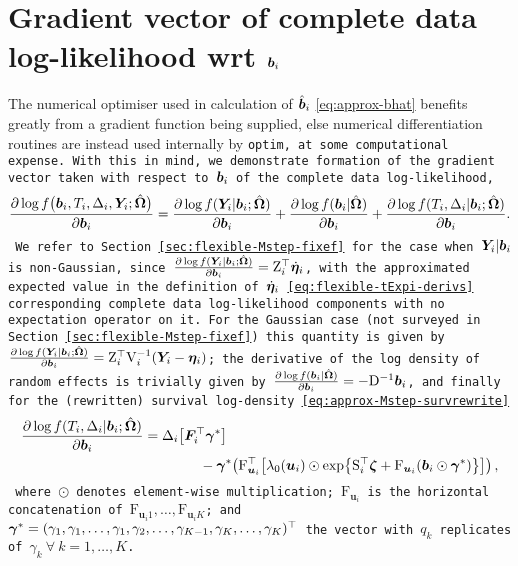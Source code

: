 \section{Gradient vector of complete data log-likelihood wrt \texorpdfstring{$\bm{b}_i$}{b}}\label{sec:appendix-gradb}
The numerical optimiser used in calculation of $\hat{\bm{b}}_i$ \eqref{eq:approx-bhat} benefits greatly from a gradient function being supplied, else numerical differentiation routines are instead used internally by \tt{optim}, at some computational expense. With this in mind, we demonstrate formation of the gradient vector taken with respect to $\bm{b}_i$ of the complete data log-likelihood,
\begin{equation}
    \frac{\partial\log f\big(\bm{b}_i,T_i,\Delta_i,\bm{Y}_i;\hat{\bm{\Omega}}\big)}{\partial\bm{b}_i}=\frac{\partial\log f(\bm{Y}_i|\bm{b}_i;\hat{\bm{\Omega}})}{\partial\bm{b}_i}+\frac{\partial\log f(\bm{b}_i|\hat{\bm{\Omega}})}{\partial\bm{b}_i} + \frac{\partial\log f(T_i, \Delta_i|\bm{b}_i;\hat{\bm{\Omega}})}{\partial\bm{b}_i}.
\label{eq:appendix-logcompdatadb}
\end{equation}
We refer to Section \ref{sec:flexible-Mstep-fixef} for the case when $\bm{Y}_i|\bm{b}_i$ is non-Gaussian, since $\frac{\partial\log f(\bm{Y}_i|\bm{b}_i;\hat{\bm{\Omega}})}{\partial\bm{b}_i}=\mathrm{Z}_i^\top\dot{\bm{\eta}}_i$, with the approximated expected value in the definition of $\dot{\bm{\eta}}_i$ \eqref{eq:flexible-tExpi-derivs} corresponding complete data log-likelihood components with no expectation operator on it. For the Gaussian case (not surveyed in Section \ref{sec:flexible-Mstep-fixef}) this quantity is given by $\frac{\partial\log f(\bm{Y}_i|\bm{b}_i;\hat{\bm{\Omega}})}{\partial\bm{b}_i}=\mathrm{Z}_i^\top\mathrm{V}_i^{-1}\!\left(\bm{Y}_i-\bm{\eta}_i\right)$; the derivative of the log density of random effects is trivially given by $\frac{\partial\log f(\bm{b}_i|\hat{\bm{\Omega}})}{\partial\bm{b}_i}=-\mathrm{D}^{-1}\bm{b}_i$, and finally for the (rewritten) survival log-density \eqref{eq:approx-Mstep-survrewrite}
\begin{equation}
    \begin{aligned}
        \frac{\partial\log f(T_i, \Delta_i|\bm{b}_i;\hat{\bm{\Omega}})}{\partial\bm{b}_i}&=\Delta_i\!\left[\bm{F}_i^\top\bm{\gamma}^*\right]\\&\qquad\quad\quad-\bm{\gamma}^*\!\left(\mathrm{F}_{\bm{u}_i}^\top\!\left[\lambda_0\!\left(\bm{u}_i\right)\odot
        \exp\!\left\{\mathrm{S}_i^\top\bm{\zeta}+\mathrm{F}_{\bm{u}_i}\!\left(\bm{b}_i\odot\bm{\gamma}^*\right)\right\}\right]\right),
    \end{aligned}
\label{eq:appendix-gradb-surv}
\end{equation}
where $\odot$ denotes element-wise multiplication; $\mathrm{F}_{\bm{u}_i}$ is the horizontal concatenation of $\mathrm{F}_{\bm{u}_i1},\dots,\mathrm{F}_{\bm{u}_iK}$; and $\bm{\gamma}^*=(\gamma_1, \gamma_1,\dots,\gamma_1,\gamma_2,\dots,\gamma_{K-1},\gamma_K,\dots,\gamma_K)^\top$ \ie the vector with $q_k$ replicates of $\gamma_k\ \forall\ k=1,\dots,K$. 

